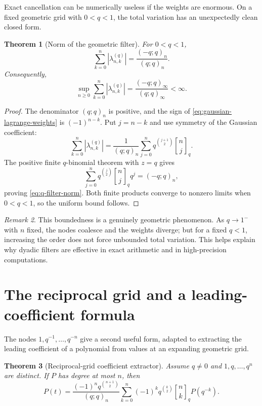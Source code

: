 \documentclass[11pt,oneside,openany]{book}
\newtheorem{theorem}{Theorem}[chapter]
\theoremstyle{definition}
\theoremstyle{remark}
\newtheorem{remark}[theorem]{Remark}
\newcommand{\qbinom}[2]{\genfrac{[}{]}{0pt}{}{#1}{#2}_{q}}
\begin{document}
Exact cancellation can be numerically useless if the weights are enormous.  On a fixed geometric grid with $0<q<1$, the total variation has an unexpectedly clean closed form.

\begin{theorem}[Norm of the geometric filter]\label{thm:q-filter-norm}
For $0<q<1$,
\begin{equation}
 \sum_{k=0}^n\left|\lambda_{n,k}^{(q)}\right|
 =\frac{(-q;q)_n}{(q;q)_n}.\label{eq:q-filter-norm}
\end{equation}
Consequently,
\[
 \sup_{n\ge0}\sum_{k=0}^n|\lambda_{n,k}^{(q)}|
 =\frac{(-q;q)_\infty}{(q;q)_\infty}<\infty.
\]
\end{theorem}

\begin{proof}
The denominator $(q;q)_n$ is positive, and the sign of \eqref{eq:gaussian-lagrange-weights} is $(-1)^{n-k}$.  Put $j=n-k$ and use symmetry of the Gaussian coefficient:
\[
 \sum_{k=0}^n|\lambda_{n,k}^{(q)}|
 =\frac1{(q;q)_n}
 \sum_{j=0}^nq^{\binom{j+1}{2}}\qbinom nj.
\]
The positive finite $q$-binomial theorem with $z=q$ gives
\[
 \sum_{j=0}^nq^{\binom j2}\qbinom njq^j=(-q;q)_n,
\]
proving \eqref{eq:q-filter-norm}.  Both finite products converge to nonzero limits when $0<q<1$, so the uniform bound follows.
\end{proof}

\begin{remark}
This boundedness is a genuinely geometric phenomenon.  As $q\to1^-$ with $n$ fixed, the nodes coalesce and the weights diverge; but for a fixed $q<1$, increasing the order does not force unbounded total variation.  This helps explain why dyadic filters are effective in exact arithmetic and in high-precision computations.
\end{remark}

\section{The reciprocal grid and a leading-coefficient formula}

The nodes $1,q^{-1},\ldots,q^{-n}$ give a second useful form, adapted to extracting the leading coefficient of a polynomial from values at an expanding geometric grid.

\begin{theorem}[Reciprocal-grid coefficient extractor]\label{thm:reciprocal-grid-extractor}
Assume $q\ne0$ and $1,q,\ldots,q^n$ are distinct.  If $P$ has degree at most $n$, then
\begin{equation}
 [t^n]P(t)=
 \frac{(-1)^nq^{\binom{n+1}{2}}}{(q;q)_n}
 \sum_{k=0}^n(-1)^kq^{\binom k2}\qbinom nkP(q^{-k}).\label{eq:reciprocal-grid-extractor}
\end{equation}
\end{theorem}
\end{document}
